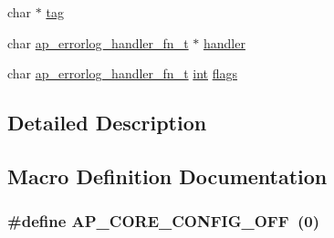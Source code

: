 \begin{DoxyCompactItemize}
\item 
char $\ast$ \hyperlink{group__APACHE__CORE__HTTPD_ga7bb5e40c10df6a41df64bda1f4bb3e26}{tag}
\item 
char \hyperlink{group__APACHE__CORE__HTTPD_gae2b87862d08783b06d2f1b6dfb161bca}{ap\+\_\+errorlog\+\_\+handler\+\_\+fn\+\_\+t} $\ast$ \hyperlink{group__APACHE__CORE__HTTPD_gad26b85d279d563bd6718cd2f2981e061}{handler}
\item 
char \hyperlink{group__APACHE__CORE__HTTPD_gae2b87862d08783b06d2f1b6dfb161bca}{ap\+\_\+errorlog\+\_\+handler\+\_\+fn\+\_\+t} \hyperlink{pcre_8txt_a42dfa4ff673c82d8efe7144098fbc198}{int} \hyperlink{group__APACHE__CORE__HTTPD_ga51be03be0607209442ab11a6100c2afe}{flags}
\end{DoxyCompactItemize}


\subsection{Detailed Description}


\subsection{Macro Definition Documentation}
\subsubsection[{\texorpdfstring{A\+P\+\_\+\+C\+O\+R\+E\+\_\+\+C\+O\+N\+F\+I\+G\+\_\+\+O\+FF}{AP_CORE_CONFIG_OFF}}]{\setlength{\rightskip}{0pt plus 5cm}\#define A\+P\+\_\+\+C\+O\+R\+E\+\_\+\+C\+O\+N\+F\+I\+G\+\_\+\+O\+FF~(0)}\hypertarget{group__APACHE__CORE__HTTPD_gab69446446d9659ab4f3390b5b4e99fe1}{}\label{group__APACHE__CORE__HTTPD_gab69446446d9659ab4f3390b5b4e99fe1}
